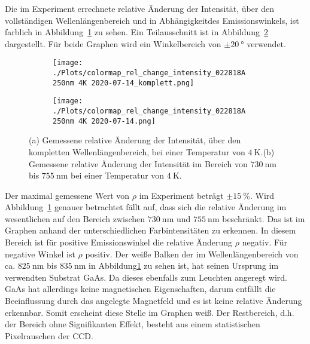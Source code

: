 Die im Experiment errechnete relative Änderung der Intensität,
über den vollständigen Wellenlängenbereich und in Abhängigkeitdes Emissionswinkels,
ist farblich in Abbildung~\ref{fig:rel_komplett} zu sehen.
Ein Teilausschnitt  ist in Abbildung~\ref{fig:rel} dargestellt.
Für beide Graphen wird ein Winkelbereich von $\pm \SI{20}{\degree}$ verwendet.
\begin{figure}
    \begin{subfigure}{0.50\textwidth}
        \texttt{[image: ./Plots/colormap\_rel\_change\_intensity\_022818A 250nm 4K 2020-07-14\_komplett.png]}
        \caption{}
        \label{fig:rel_komplett}
    \end{subfigure}
    \begin{subfigure}{0.50\textwidth}
        \texttt{[image: ./Plots/colormap\_rel\_change\_intensity\_022818A 250nm 4K 2020-07-14.png]}
        \caption{}
        \label{fig:rel}
    \end{subfigure}
    \caption{(a) Gemessene relative Änderung der Intensität, über den kompletten Wellenlängenbereich, 
    bei einer Temperatur von $\SI{4}{\kelvin}$.(b) Gemessene relative Änderung der Intensität im Bereich
     von $\SI{730}{\nano\meter}$ bis $\SI{755}{\nano\meter}$
        bei einer Temperatur von $\SI{4}{\kelvin}$.}
    \label{fig:rho}
\end{figure}
\FloatBarrier
Der maximal gemessene Wert von $\rho$ im Experiment beträgt $\pm \SI{15}{\percent}$. 
Wird Abbildung~\ref{fig:rel_komplett} genauer betrachtet fällt auf, dass sich die 
relative Änderung im wesentlichen auf den Bereich zwischen $\SI{730}{\nano\meter}$ und $\SI{755}{\nano\meter}$
beschränkt.
Das ist im Graphen anhand der unterschiedlichen Farbintensitäten zu erkennen. 
In diesem Bereich ist für positive Emissionswinkel die relative Änderung $\rho$ negativ.
Für negative Winkel ist $\rho$ positiv.
Der weiße Balken der im Wellenlängenbereich von ca. $\SI{825}{\nano\meter}$ bis $\SI{835}{\nano\meter}$ 
in Abbildung\ref{fig:rel_komplett} zu sehen ist, 
hat seinen Ursprung im verwendten Substrat GaAs. 
Da dieses ebenfalls zum Leuchten angeregt wird.
GaAs hat allerdings keine magnetischen Eigenschaften, 
darum entfällt die Beeinflussung durch das angelegte Magnetfeld
und es ist keine relative Änderung erkennbar.
Somit erscheint diese Stelle im Graphen weiß.
Der Restbereich, d.h. der Bereich ohne Signifikanten Effekt, besteht aus einem statistischen Pixelrauschen der CCD.


